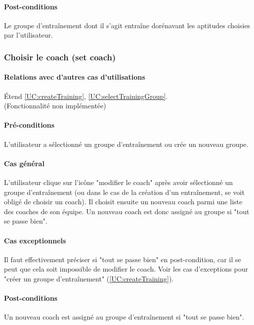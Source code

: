 \paragraph{Post-conditions}
\begin{list}{}{\leftmargin=1.5em}
\item{Le groupe d'entraînement dont il s'agit entraîne dorénavant les aptitudes choisies par l'utilisateur.}
\end{list}

\subsubsection{Choisir le coach (set coach)}
\label{UC:chooseTrainingCoach}
\paragraph{Relations avec d'autres cas d'utilisations}
Étend \ref{UC:createTraining}, \ref{UC:selectTrainingGroup}.
\\(Fonctionnalité non implémentée)
\paragraph{Pré-conditions}
\begin{list}{}{\leftmargin=1.5em}
\item{L'utilisateur a sélectionné un groupe d'entraînement ou crée un nouveau groupe.}
\end{list}
\paragraph{Cas général}
L'utilisateur clique sur l'icône "modifier le coach" après avoir sélectionné un groupe d'entraînement (ou dans le cas de la création d'un entraînement, se voit obligé de choisir un coach). Il choisit ensuite un nouveau coach parmi une liste des coaches de son équipe. Un nouveau coach est donc assigné au groupe si "tout se passe bien".
\paragraph{Cas exceptionnels}
Il faut effectivement préciser si "tout se passe bien" en post-condition, car il se peut que cela soit impossible de modifier le coach. Voir les cas d'exceptions pour "créer un groupe d'entraînement" (\ref{UC:createTraining}).
\paragraph{Post-conditions}
\begin{list}{}{\leftmargin=1.5em}
\item{Un nouveau coach est assigné au groupe d'entraînement si "tout se passe bien".}
\end{list}

